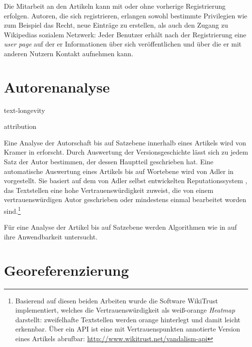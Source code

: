 Die Mitarbeit an den Artikeln kann mit oder ohne vorherige Registrierung erfolgen.
Autoren, die sich registrieren, erlangen sowohl bestimmte Privilegien wie zum Beispiel das Recht, neue Einträge zu erstellen, als auch den Zugang zu Wikipedias sozialem Netzwerk:
Jeder Benutzer erhält nach der Registrierung eine \emph{user page} auf der er Informationen über sich veröffentlichen und über die er mit anderen Nutzern Kontakt aufnehmen kann.\cite{wikiwhyaccount}


\section{Autorenanalyse}\label{sec:contribution}


\begin{todos}
    \item text-longevity
    \item attribution
\end{todos}

Eine Analyse der Autorschaft bis auf Satzebene innerhalb eines Artikels wird von Kramer in \cite{kramer2008wiki} erforscht.
Durch Auswertung der Versionsgeschichte lässt sich zu jedem Satz der Autor bestimmen, der dessen Hauptteil geschrieben hat.
Eine automatische Auswertung eines Artikels bis auf Wortebene wird von Adler in \cite{adler2008assigning} vorgestellt.
Sie basiert auf dem von Adler selbst entwickelten Reputationssystem \cite{adler2007content}, das Textstellen eine hohe Vertrauenswürdigkeit zuweist, die von einem vertrauenswürdigen Autor geschrieben oder mindestens einmal bearbeitet worden sind.\footnote{Basierend auf diesen beiden Arbeiten wurde die Software WikiTrust implementiert, welches die Vertrauenswürdigkeit als weiß-orange \emph{Heatmap} darstellt: zweifelhafte Textstellen werden orange hinterlegt und damit leicht erkennbar. Über ein API ist eine mit Vertrauenspunkten annotierte Version eines Artikels abrufbar: \url{http://www.wikitrust.net/vandalism-api}\label{wikitrust}}

Für eine Analyse der Artikel bis auf Satzebene werden Algorithmen wie in \cite{kramer2008wiki} auf ihre Anwendbarkeit untersucht.


\section{Georeferenzierung}\label{sec:georeference}

